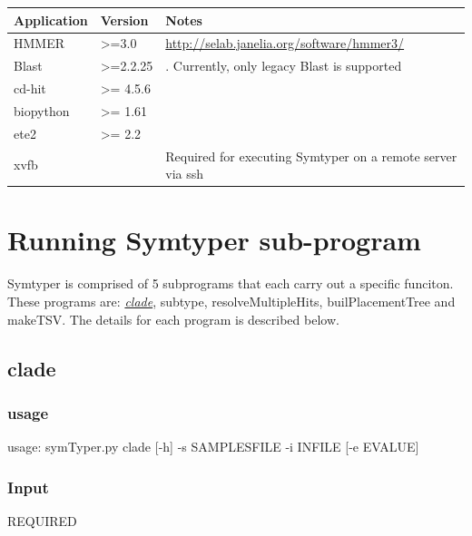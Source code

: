 \documentclass[letterpaper,10pt,english]{sphinxmanual}
\begin{document}
\begin{tabulary}{\linewidth}{|L|L|L|}
\hline
\textsf{\relax 
Application
} & \textsf{\relax 
Version
} & \textsf{\relax 
Notes
}\\
\hline
HMMER
 & 
\textgreater{}=3.0
 & 
\href{http://selab.janelia.org/software/hmmer3/}{http://selab.janelia.org/software/hmmer3/}
\\

Blast
 & 
\textgreater{}=2.2.25
 & 
. Currently, only legacy Blast is supported
\\

cd-hit
 & 
\textgreater{}= 4.5.6
 & \\

biopython
 & 
\textgreater{}= 1.61
 & \\

ete2
 & 
\textgreater{}= 2.2
 & \\

xvfb
 &  & 
Required for executing Symtyper on a remote server via ssh
\\
\hline\end{tabulary}



\section{Running Symtyper sub-program}
\label{CommandLine:running-symtyper-sub-program}
Symtyper is comprised of 5 subprograms that each carry out a specific funciton.
These programs are: {\hyperref[CommandLine:clade]{\emph{clade}}}, subtype, resolveMultipleHits, builPlacementTree and makeTSV.
The details for each program is described below.


\subsection{clade}
\label{CommandLine:clade}\label{CommandLine:id1}

\subsubsection{usage}
\label{CommandLine:usage}
usage: symTyper.py clade {[}-h{]} -s SAMPLESFILE -i INFILE {[}-e EVALUE{]}


\subsubsection{Input}
\label{CommandLine:input}
REQUIRED
\end{document}
